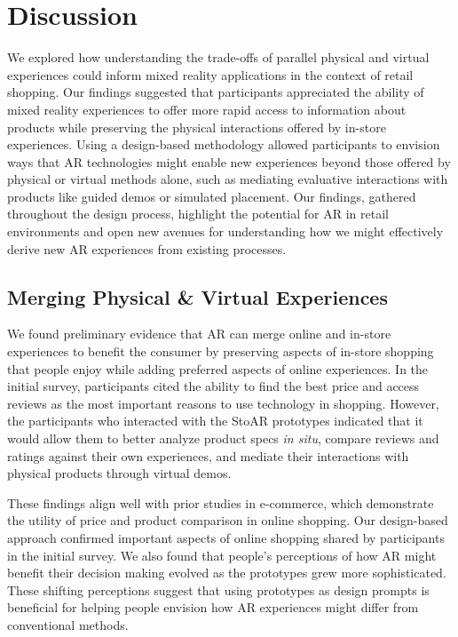 \section{Discussion}
We explored how understanding the trade-offs of parallel physical and virtual experiences could inform mixed reality applications in the context of retail shopping. Our findings suggested that participants appreciated the ability of mixed reality experiences to offer more rapid access to information about products while preserving the physical interactions offered by in-store experiences. Using a design-based methodology allowed participants to envision ways that AR technologies might enable new experiences beyond those offered by physical or virtual methods alone, such as mediating evaluative interactions with products like guided demos or simulated placement.  
Our findings, gathered throughout the design process, highlight the potential for AR in retail environments and open new avenues for understanding how we might effectively derive new AR experiences from existing processes. 

\subsection{Merging Physical \& Virtual Experiences}
We found preliminary evidence that AR can merge online and in-store experiences to benefit the consumer by preserving aspects of in-store shopping that people enjoy while adding preferred aspects of online experiences.  In the initial survey, participants cited the ability to find the best price and access reviews as the most important reasons to use technology in shopping. However, the participants who interacted with the StoAR prototypes indicated that it would allow them to better analyze product specs \emph{in situ}, compare reviews and ratings against their own experiences, and mediate their interactions with physical products through virtual demos.

These findings align well with prior studies in e-commerce, which demonstrate the utility of price and product comparison in online shopping.  Our design-based approach confirmed important aspects of online shopping shared by participants in the initial survey. We also found that people's perceptions of how AR might benefit their decision making evolved as the prototypes grew more sophisticated. These shifting perceptions suggest that using prototypes as design prompts is beneficial for helping people envision how AR experiences might differ from conventional methods. 

